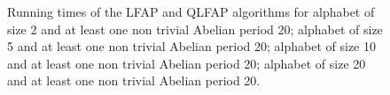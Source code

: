 \documentclass[3p]{elsarticle}
\begin{document}
\begin{figure}
  \hspace{.3cm}

  \hspace{.3cm}

\caption{
\label{fig-expe2}
Running times of the LFAP and QLFAP algorithms for
 \protect{} alphabet of size 2 and at least one non trivial Abelian period 20; 
 \protect{} alphabet of size 5 and at least one non trivial Abelian period 20; 
 \protect{} alphabet of size 10 and at least one non trivial Abelian period 20; 
 \protect{} alphabet of size 20 and at least one non trivial Abelian period 20.
}
\end{figure}
\end{document}
